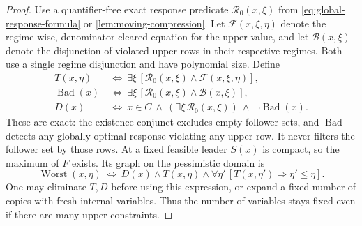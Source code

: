 \begin{proof}
Use a quantifier-free exact response predicate $\mathcal R_0(x,\xi)$
from \eqref{eq:global-response-formula} or
\cref{lem:moving-compression}. Let $\mathcal F(x,\xi,\eta)$ denote
the regime-wise, denominator-cleared equation for the upper value, and
let $\mathcal B(x,\xi)$ denote the disjunction of violated upper rows
in their respective regimes. Both use a single regime disjunction and
have polynomial size. Define
\begin{align}
 T(x,\eta)&\ \Longleftrightarrow\
   \exists\xi\,[\mathcal R_0(x,\xi)\wedge\mathcal F(x,\xi,\eta)],
 \label{eq:upper-response-values}\\
 \operatorname{Bad}(x)&\ \Longleftrightarrow\
   \exists\xi\,[\mathcal R_0(x,\xi)\wedge\mathcal B(x,\xi)],
 \nonumber\\
 D(x)&\ \Longleftrightarrow\
   x\in C\ \wedge\ (\exists\xi\,\mathcal R_0(x,\xi))
                         \ \wedge\ \neg\operatorname{Bad}(x).
 \nonumber
\end{align}
These are exact: the existence conjunct excludes empty follower sets,
and $\operatorname{Bad}$ detects any globally optimal response violating
any upper row. It never filters the follower set by those rows. At a
fixed feasible leader $S(x)$ is compact, so the maximum of $F$ exists.
Its graph on the pessimistic domain is
\begin{equation}\label{eq:worst-value-formula}
 \operatorname{Worst}(x,\eta)\ \Longleftrightarrow\
 D(x)\wedge T(x,\eta)\wedge
              \forall\eta'\,[T(x,\eta')\Longrightarrow\eta'\le\eta].
\end{equation}
One may eliminate $T,D$ before using this expression, or expand a fixed
number of copies with fresh internal variables. Thus the number of
variables stays fixed even if there are many upper constraints.


\end{proof}
